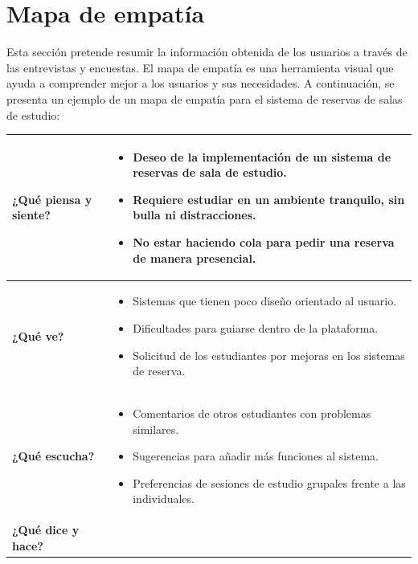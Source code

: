 \documentclass{article}
\begin{document}
\newpage
\section{Mapa de empatía}

Esta sección pretende resumir la información obtenida de los usuarios a través de las entrevistas y encuestas. El mapa de empatía es una herramienta visual que ayuda a comprender mejor a los usuarios y sus necesidades. A continuación, se presenta un ejemplo de un mapa de empatía para el sistema de reservas de salas de estudio:

\begin{center}
  \begin{tabular}{|>{\centering\arraybackslash}m{3cm}|>{\centering\arraybackslash}p{11cm}|}
    \hline
    \textbf{¿Qué piensa y siente?} & 
    \begin{itemize}[leftmargin=*, label={--}]
      \item Deseo de la implementación de un sistema de reservas de sala de estudio.
      \item Requiere estudiar en un ambiente tranquilo, sin bulla ni distracciones.
      \item No estar haciendo cola para pedir una reserva de manera presencial.
    \end{itemize} \\ \hline
    \textbf{¿Qué ve?} & 
    \begin{itemize}[leftmargin=*, label={--}]
      \item Sistemas que tienen poco diseño orientado al usuario.
      \item Dificultades para guiarse dentro de la plataforma.
      \item Solicitud de los estudiantes por mejoras en los sistemas de reserva.
    \end{itemize} \\ \hline
    \textbf{¿Qué escucha?} & 
    \begin{itemize}[leftmargin=*, label={--}]
      \item Comentarios de otros estudiantes con problemas similares.
      \item Sugerencias para añadir más funciones al sistema.
      \item Preferencias de sesiones de estudio grupales frente a las individuales.
    \end{itemize} \\ \hline
    \textbf{¿Qué dice y hace?} & 
    \begin{itemize}[leftmargin=*, label={--}]

\end{itemize}
\end{tabular}
\end{center}
\end{document}
